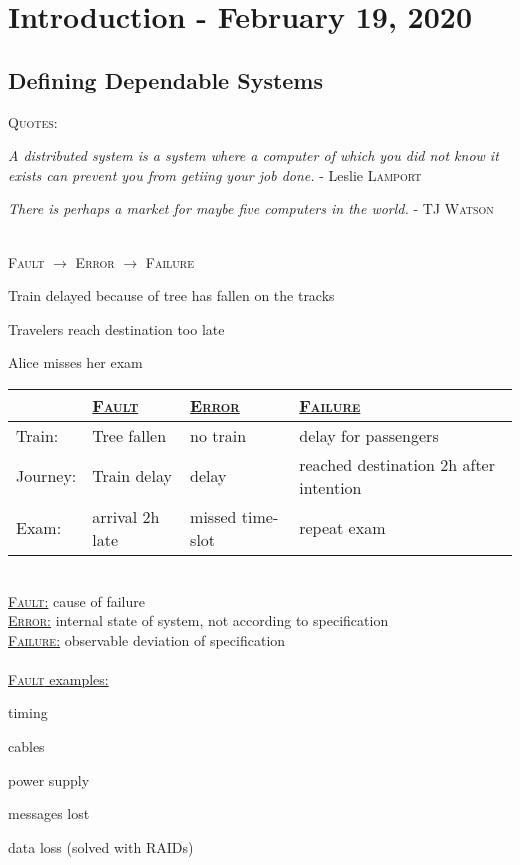 \documentclass{article}
\begin{document}
	\pagestyle{fancy}
	\section{Introduction - February 19, 2020}
	\begin{adjustwidth}{2em}{2em}
		\subsection{Defining Dependable Systems}
		\begin{adjustwidth}{2em}{2em}
			\textsc{Quotes:}
			\begin{adjustwidth}{2em}{}
				\textit{A distributed system is a system where a computer of which you did not know it exists can prevent you from getiing your job done.} - Leslie \textsc{Lamport}
			\end{adjustwidth}
			\vspace{0.2cm}
			\begin{adjustwidth}{2em}{}
				\textit{There is perhaps a market for maybe five computers in the world.} - TJ \textsc{Watson}
			\end{adjustwidth}
			\hfill \\
			\textsc{Fault} $\rightarrow$ \textsc{Error} $\rightarrow$ \textsc{Failure}
			\begin{compactenum}[-]
				\item Train delayed because of tree has fallen on the tracks
				\item Travelers reach destination too late
				\item Alice misses her exam
			\end{compactenum}
			\vspace{0.2cm}
			\begin{tabular}{|l|lll|}
				\hline
				& \underline{\textsc{Fault}} & \underline{\textsc{Error}} & \underline{\textsc{Failure}} \\
				\hline
				Train: & Tree fallen & no train & delay for passengers \\
				Journey: & Train delay & delay & reached destination 2h after intention \\
				Exam: & arrival 2h late & missed time-slot & repeat exam \\
				\hline
			\end{tabular}
			\hfill \\
			\underline{\textsc{Fault:}} cause of failure \\
			\underline{\textsc{Error:}} internal state of system, not according to specification \\
			\underline{\textsc{Failure:}} observable deviation of specification
			\hfill \\ \\
			\underline{\textsc{Fault} examples:}
			\begin{compactenum}[-]
				\item timing
				\item cables
				\item power supply
				\item messages lost
				\item data loss (solved with RAIDs)
			\end{compactenum}

\end{adjustwidth}
\end{adjustwidth}
\end{document}
